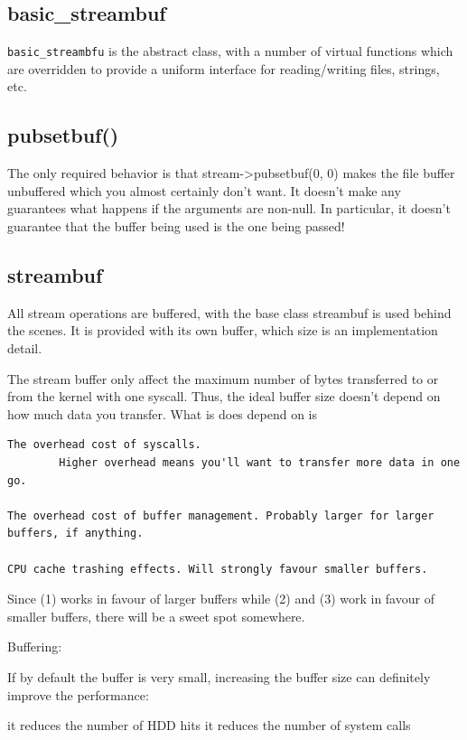 \subsection{basic\_streambuf}
\label{sec:basic_streambuf}

\verb!basic_streambfu! is the abstract class, with a number of virtual functions
which are overridden to provide a uniform interface for reading/writing files, strings, etc.

\subsection{pubsetbuf()}

The only required behavior is that stream->pubsetbuf(0, 0) makes the file buffer
unbuffered which you almost certainly don't want. It doesn't make any guarantees
what happens if the arguments are non-null.
In particular, it doesn't guarantee that the buffer being used is the one being
passed! 

\subsection{streambuf}
\label{sec:streambuf}

All stream operations are buffered, with the base class streambuf is used behind
the scenes. It is provided with its own buffer, which size is an implementation
detail.

The stream buffer only affect the maximum number of bytes transferred to or from
the kernel with one syscall. Thus, the ideal buffer size doesn't depend on how
much data you transfer. What is does depend on is

\begin{verbatim}
The overhead cost of syscalls. 
        Higher overhead means you'll want to transfer more data in one go.

The overhead cost of buffer management. Probably larger for larger buffers, if anything.

CPU cache trashing effects. Will strongly favour smaller buffers.
\end{verbatim}
Since (1) works in favour of larger buffers while (2) and (3) work in favour of
smaller buffers, there will be a sweet spot somewhere.


Buffering:

If by default the buffer is very small, increasing the buffer size can definitely improve the performance:

    it reduces the number of HDD hits
    it reduces the number of system calls

